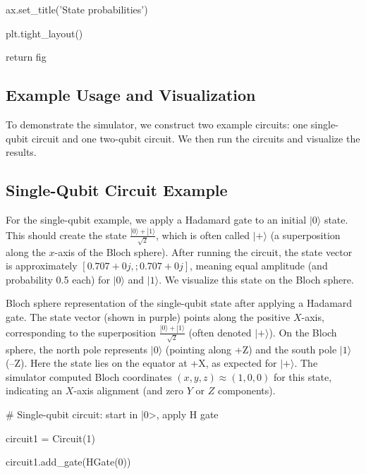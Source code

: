 \documentclass[%
oneside,                 %
final,                   %
10pt]{article}
\begin{document}
            ax.set_title('State probabilities')

            plt.tight_layout()

            return fig


\epycod


\subsection{Example Usage and Visualization}

To demonstrate the simulator, we construct two example circuits: one
single-qubit circuit and one two-qubit circuit. We then run the
circuits and visualize the results.

\subsection{Single-Qubit Circuit Example}

For the single-qubit example, we apply a Hadamard gate to an initial
$|0\rangle$ state. This should create the state
$\frac{|0\rangle +|1\rangle}{\sqrt{2}}$, which is often called $|+\rangle$ (a
superposition along the $x$-axis of the Bloch sphere). After running
the circuit, the state vector is approximately $[0.707+0j,;0.707+0j]$,
meaning equal amplitude (and probability 0.5 each) for $|0\rangle$ and
$|1\rangle$. We visualize this state on the Bloch sphere.

Bloch sphere representation of the single-qubit state after applying a
Hadamard gate. The state vector (shown in purple) points along the
positive $X$-axis, corresponding to the superposition $\frac{|0\rangle
+ |1\rangle}{\sqrt{2}}$ (often denoted $|+\rangle$). On the Bloch
sphere, the north pole represents $|0\rangle$ (pointing along +Z) and
the south pole $|1\rangle$ (–Z). Here the state lies on the equator at
+X, as expected for $|+\rangle$. The simulator computed Bloch
coordinates $(x,y,z) \approx (1,0,0)$ for this state, indicating an
$X$-axis alignment (and zero $Y$ or $Z$ components).
















\bpycod
# Single-qubit circuit: start in |0>, apply H gate

circuit1 = Circuit(1)

circuit1.add_gate(HGate(0))
\end{document}
